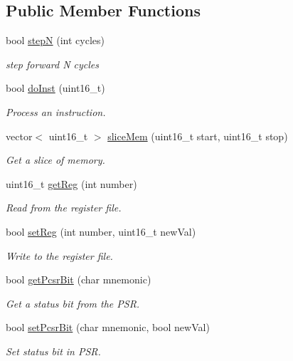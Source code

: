 \subsection*{Public Member Functions}
\begin{DoxyCompactItemize}
\item 
bool \hyperlink{classsimulator_a0b627c7dfa086c2e712447f6f52df45a}{step\-N} (int cycles)
\begin{DoxyCompactList}\small\item\em step forward N cycles \end{DoxyCompactList}\item 
bool \hyperlink{classsimulator_a22bf3281b0165d3d93fb71658b19fdb8}{do\-Inst} (uint16\-\_\-t)
\begin{DoxyCompactList}\small\item\em Process an instruction. \end{DoxyCompactList}\item 
vector$<$ uint16\-\_\-t $>$ \hyperlink{classsimulator_a67f2ca29746d88a463751c5eba137f8c}{slice\-Mem} (uint16\-\_\-t start, uint16\-\_\-t stop)
\begin{DoxyCompactList}\small\item\em Get a slice of memory. \end{DoxyCompactList}\item 
uint16\-\_\-t \hyperlink{classsimulator_adf34711d9ba2ef3e98dea9600a44576d}{get\-Reg} (int number)
\begin{DoxyCompactList}\small\item\em Read from the register file. \end{DoxyCompactList}\item 
bool \hyperlink{classsimulator_a99ff28d7459e1e5634f78aa204e1b81b}{set\-Reg} (int number, uint16\-\_\-t new\-Val)
\begin{DoxyCompactList}\small\item\em Write to the register file. \end{DoxyCompactList}\item 
bool \hyperlink{classsimulator_a9cc84c8d70c5095de7ea0e3cf6ff3164}{get\-Pcsr\-Bit} (char mnemonic)
\begin{DoxyCompactList}\small\item\em Get a status bit from the P\-S\-R. \end{DoxyCompactList}\item 
bool \hyperlink{classsimulator_a6cc07560fc476a4d733b8c5ff6925351}{set\-Pcsr\-Bit} (char mnemonic, bool new\-Val)
\begin{DoxyCompactList}\small\item\em Set status bit in P\-S\-R. \end{DoxyCompactList}\item 

\end{DoxyCompactItemize}
